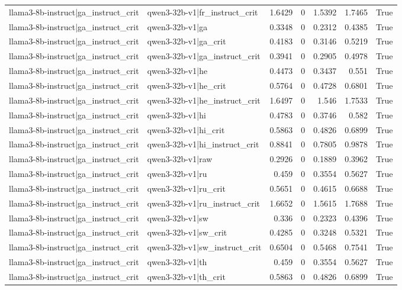 \begin{table}
\begin{tabular}{l l r r r r l}
llama3-8b-instruct|ga_instruct_crit & qwen3-32b-v1|fr_instruct_crit & 1.6429 & 0 & 1.5392 & 1.7465 & True \\
llama3-8b-instruct|ga_instruct_crit & qwen3-32b-v1|ga & 0.3348 & 0 & 0.2312 & 0.4385 & True \\
llama3-8b-instruct|ga_instruct_crit & qwen3-32b-v1|ga_crit & 0.4183 & 0 & 0.3146 & 0.5219 & True \\
llama3-8b-instruct|ga_instruct_crit & qwen3-32b-v1|ga_instruct_crit & 0.3941 & 0 & 0.2905 & 0.4978 & True \\
llama3-8b-instruct|ga_instruct_crit & qwen3-32b-v1|he & 0.4473 & 0 & 0.3437 & 0.551 & True \\
llama3-8b-instruct|ga_instruct_crit & qwen3-32b-v1|he_crit & 0.5764 & 0 & 0.4728 & 0.6801 & True \\
llama3-8b-instruct|ga_instruct_crit & qwen3-32b-v1|he_instruct_crit & 1.6497 & 0 & 1.546 & 1.7533 & True \\
llama3-8b-instruct|ga_instruct_crit & qwen3-32b-v1|hi & 0.4783 & 0 & 0.3746 & 0.582 & True \\
llama3-8b-instruct|ga_instruct_crit & qwen3-32b-v1|hi_crit & 0.5863 & 0 & 0.4826 & 0.6899 & True \\
llama3-8b-instruct|ga_instruct_crit & qwen3-32b-v1|hi_instruct_crit & 0.8841 & 0 & 0.7805 & 0.9878 & True \\
llama3-8b-instruct|ga_instruct_crit & qwen3-32b-v1|raw & 0.2926 & 0 & 0.1889 & 0.3962 & True \\
llama3-8b-instruct|ga_instruct_crit & qwen3-32b-v1|ru & 0.459 & 0 & 0.3554 & 0.5627 & True \\
llama3-8b-instruct|ga_instruct_crit & qwen3-32b-v1|ru_crit & 0.5651 & 0 & 0.4615 & 0.6688 & True \\
llama3-8b-instruct|ga_instruct_crit & qwen3-32b-v1|ru_instruct_crit & 1.6652 & 0 & 1.5615 & 1.7688 & True \\
llama3-8b-instruct|ga_instruct_crit & qwen3-32b-v1|sw & 0.336 & 0 & 0.2323 & 0.4396 & True \\
llama3-8b-instruct|ga_instruct_crit & qwen3-32b-v1|sw_crit & 0.4285 & 0 & 0.3248 & 0.5321 & True \\
llama3-8b-instruct|ga_instruct_crit & qwen3-32b-v1|sw_instruct_crit & 0.6504 & 0 & 0.5468 & 0.7541 & True \\
llama3-8b-instruct|ga_instruct_crit & qwen3-32b-v1|th & 0.459 & 0 & 0.3554 & 0.5627 & True \\
llama3-8b-instruct|ga_instruct_crit & qwen3-32b-v1|th_crit & 0.5863 & 0 & 0.4826 & 0.6899 & True \\

\end{tabular}
\end{table}
